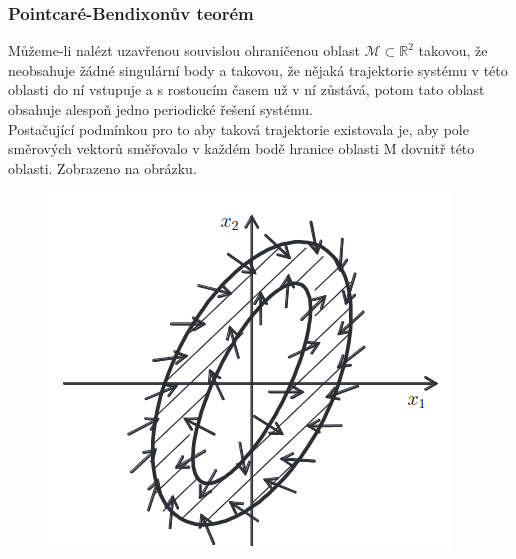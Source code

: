 \subsubsection*{Pointcaré-Bendixonův teorém}
Můžeme-li nalézt uzavřenou souvislou ohraničenou oblast \(\mathcal{M} \subset \mathbb{R}^2\) takovou, že neobsahuje žádné singulární body a takovou, že nějaká trajektorie systému v této oblasti do ní vstupuje a s rostoucím časem už v ní zůstává, potom tato oblast obsahuje alespoň jedno periodické řešení systému.\\
Postačující podmínkou pro to aby taková trajektorie existovala je, aby pole směrových vektorů směřovalo v každém bodě hranice oblasti M dovnitř této oblasti. Zobrazeno na obrázku.\\
\begin{figure}[h!]
    \centering
    \includegraphics[scale = 0.5]{img/PointBendix.png}
\end{figure}

